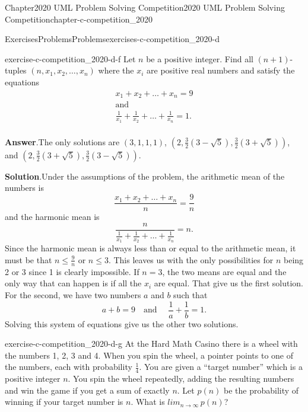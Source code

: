 \documentclass[oneside,10pt,]{book}
\newcommand{\blocktitlefont}{\relax}
\numberwithin{equation}{section}
\begin{document}
\begin{chapterptx}{Chapter}{2020 UML Problem Solving Competition}{}{2020 UML Problem Solving Competition}{}{}{chapter-c-competition_2020}
\begin{exercises-section}{Exercises}{Problems}{}{Problems}{}{}{exercises-c-competition_2020-d}
\begin{divisionexercise}{5}{}{}{exercise-c-competition_2020-d-f}
Let \(n\) be a positive integer.  Find all \((n+1)\)-tuples \((n, x_1, x_2, \dots , x_n)\) where the \(x_i\) are positive real numbers and satisfy the equations%
\begin{equation*}
\begin{array}{cc}
x_1 + x_2 + \dots + x_n = 9 \\
\textrm{and}\\
\frac{1}{x_1}+\frac{1}{x_2} + \dots + \frac{1}{x_n} = 1. \\
\end{array}
\end{equation*}
%
\par\smallskip%
\noindent\textbf{\blocktitlefont Answer}.\hypertarget{answer-c-competition_2020-d-f-b}{}\quad{}The only solutions are \((3,1,1,1)\), \((2,\frac{3}{2} \left(3-\sqrt{5}\right) , \frac{3}{2} \left(3+\sqrt{5}\right))\), and \((2,\frac{3}{2} \left(3+\sqrt{5}\right) , \frac{3}{2} \left(3-\sqrt{5}\right))\).%
\par\smallskip%
\noindent\textbf{\blocktitlefont Solution}.\hypertarget{solution-c-competition_2020-d-f-c}{}\quad{}Under the assumptions of the problem, the arithmetic mean of the numbers is%
\begin{equation*}
\frac{ x_1 + x_2 + \dots + x_n}{n} = \frac{9}{n}
\end{equation*}
and the harmonic mean is%
\begin{equation*}
\frac{n}{ \frac{1}{x_1}+\frac{1}{x_2} + \dots + \frac{1}{x_n}} = n.
\end{equation*}
Since the harmonic mean is always less than or equal to the arithmetic mean, it must be that \(n \leq  \frac{9}{n}\) or \(n \leq 3\).  This leaves us with the only possibilities for \(n\) being 2 or 3 since 1 is clearly impossible.  If \(n=3\), the two means are equal and the only way that can happen is if all the \(x_i\) are equal.  That give us the first solution.  For the second, we have two numbers \(a\) and \(b\) such that%
\begin{equation*}
a + b = 9 \quad\textrm{and }\quad  \frac{1}{a}+\frac{1}{b}=1.
\end{equation*}
Solving this system of equations give us the other two solutions.%
\end{divisionexercise}%
\begin{divisionexercise}{6}{}{}{exercise-c-competition_2020-d-g}%
At the Hard Math Casino there is a wheel with the numbers 1, 2, 3 and 4.  When you spin the wheel, a pointer points to one of the numbers, each with probability \(\frac{1}{4}\). You are given a “target number” which  is a positive integer \(n\). You spin the wheel repeatedly, adding the resulting  numbers and win the game if you get a sum of exactly \(n\). Let \(p(n)\) be the probability of winning if your target number is \(n\).  What is \(lim_{n\rightarrow \infty}\, p(n)\)?%

\end{divisionexercise}
\end{exercises-section}
\end{chapterptx}
\end{document}
